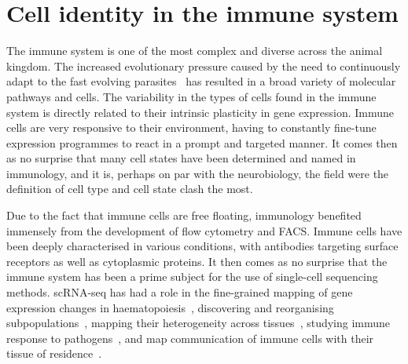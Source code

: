 
\section{Cell identity in the immune system}  %
\label{section1.4}

The immune system is one of the most complex and diverse across the animal kingdom. The increased evolutionary pressure caused by the need to continuously adapt to the fast evolving parasites~\citep{barreiro_evolutionary_2010} has resulted in a broad variety of molecular pathways and cells. The variability in the types of cells found in the immune system is directly related to their intrinsic plasticity in gene expression. Immune cells are very responsive to their environment, having to constantly fine-tune expression programmes to react in a prompt and targeted manner. It comes then as no surprise that many cell states have been determined and named in immunology, and it is, perhaps on par with the neurobiology, the field were the definition of cell type and cell state clash the most. 

Due to the fact that immune cells are free floating, immunology benefited immensely from the development of flow cytometry and FACS. Immune cells have been deeply characterised in various conditions, with antibodies targeting surface receptors as well as cytoplasmic proteins. It then comes as no surprise that the immune system has been a prime subject for the use of single-cell sequencing methods. scRNA-seq has had a role in the fine-grained mapping of gene expression changes in haematopoiesis~\citep{watcham_new_2019}, discovering and reorganising subpopulations~\citep{villani_single-cell_2017}, mapping their heterogeneity across tissues~\citep{}, studying immune response to pathogens~\citep{lonnberg_single-cell_2017,stubbington_t_2016}, and map communication of immune cells with their tissue of residence~\citep{vento-tormo_single-cell_2018}.

